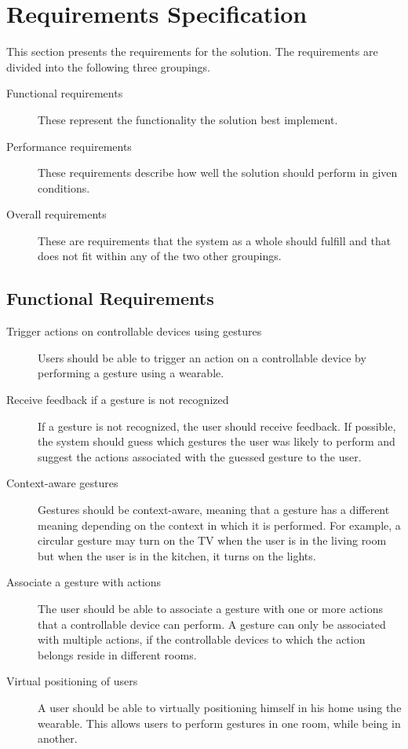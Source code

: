 \section{Requirements Specification}
\label{sec:requirements-specification}

This section presents the requirements for the solution. The requirements are divided into the following three groupings.

\begin{description}
\item[Functional requirements] These represent the functionality the solution best implement.
\item[Performance requirements] These requirements describe how well the solution should perform in given conditions.
\item[Overall requirements] These are requirements that the system as a whole should fulfill and that does not fit within any of the two other groupings.
\end{description}

\subsection{Functional Requirements}

\begin{description}
\item[Trigger actions on controllable devices using gestures] Users should be able to trigger an action on a controllable device by performing a gesture using a wearable.
\item[Receive feedback if a gesture is not recognized] If a gesture is not recognized, the user should receive feedback. If possible, the system should guess which gestures the user was likely to perform and suggest the actions associated with the guessed gesture to the user.
\item[Context-aware gestures] Gestures should be context-aware, meaning that a gesture has a different meaning depending on the context in which it is performed. For example, a circular gesture may turn on the TV when the user is in the living room but when the user is in the kitchen, it turns on the lights.
\item[Associate a gesture with actions] The user should be able to associate a gesture with one or more actions that a controllable device can perform. A gesture can only be associated with multiple actions, if the controllable devices to which the action belongs reside in different rooms.
\item[Virtual positioning of users] A user should be able to virtually positioning himself in his home using the wearable. This allows users to perform gestures in one room, while being in another.
\end{description}

